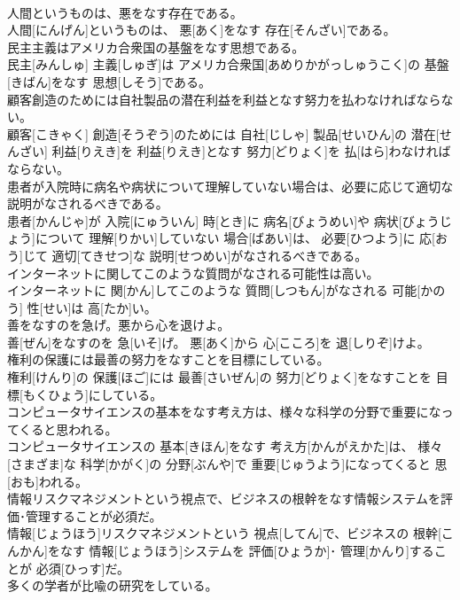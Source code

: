 \documentclass[8pt]{extreport}
\begin{document}
\begin{CJK}{UTF8}{min}
\\	人間というものは、悪をなす存在である。	
\\	人間[にんげん]というものは、 悪[あく]をなす 存在[そんざい]である。
\\	民主主義はアメリカ合衆国の基盤をなす思想である。	
\\	民主[みんしゅ] 主義[しゅぎ]は アメリカ合衆国[あめりかがっしゅうこく]の 基盤[きばん]をなす 思想[しそう]である。
\\	顧客創造のためには自社製品の潜在利益を利益となす努力を払わなければならない。	
\\	顧客[こきゃく] 創造[そうぞう]のためには 自社[じしゃ] 製品[せいひん]の 潜在[せんざい] 利益[りえき]を 利益[りえき]となす 努力[どりょく]を 払[はら]わなければならない。
\\	患者が入院時に病名や病状について理解していない場合は、必要に応じて適切な説明がなされるべきである。	
\\	患者[かんじゃ]が 入院[にゅういん] 時[とき]に 病名[びょうめい]や 病状[びょうじょう]について 理解[りかい]していない 場合[ばあい]は、 必要[ひつよう]に 応[おう]じて 適切[てきせつ]な 説明[せつめい]がなされるべきである。
\\	インターネットに関してこのような質問がなされる可能性は高い。	
\\	インターネットに 関[かん]してこのような 質問[しつもん]がなされる 可能[かのう] 性[せい]は 高[たか]い。
\\	善をなすのを急げ。悪から心を退けよ。	
\\	善[ぜん]をなすのを 急[いそ]げ。 悪[あく]から 心[こころ]を 退[しりぞ]けよ。
\\	権利の保護には最善の努力をなすことを目標にしている。	
\\	権利[けんり]の 保護[ほご]には 最善[さいぜん]の 努力[どりょく]をなすことを 目標[もくひょう]にしている。
\\	コンピュータサイエンスの基本をなす考え方は、様々な科学の分野で重要になってくると思われる。	
\\	コンピュータサイエンスの 基本[きほん]をなす 考え方[かんがえかた]は、 様々[さまざま]な 科学[かがく]の 分野[ぶんや]で 重要[じゅうよう]になってくると 思[おも]われる。
\\	情報リスクマネジメントという視点で、ビジネスの根幹をなす情報システムを評価･管理することが必須だ。	
\\	情報[じょうほう]リスクマネジメントという 視点[してん]で、ビジネスの 根幹[こんかん]をなす 情報[じょうほう]システムを 評価[ひょうか]･ 管理[かんり]することが 必須[ひっす]だ。
\\	多くの学者が比喩の研究をしている。	

\end{CJK}
\end{document}

